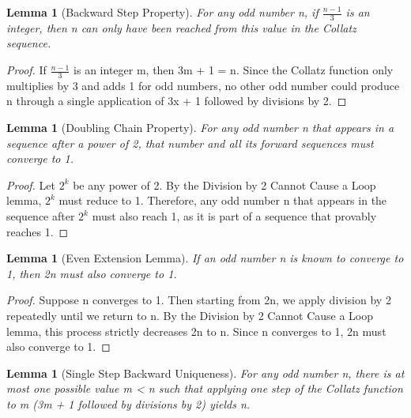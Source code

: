 \documentclass[11pt]{article}
\newtheorem{lemma}[theorem]{Lemma}
\begin{document}
\begin{lemma}[Backward Step Property]
For any odd number n, if \( \frac{n-1}{3} \) is an integer, then n can only have been reached from this value in the Collatz sequence.
\end{lemma}

\begin{proof}
If \( \frac{n-1}{3} \) is an integer m, then 3m + 1 = n. Since the Collatz function only multiplies by 3 and adds 1 for odd numbers, no other odd number could produce n through a single application of 3x + 1 followed by divisions by 2.
\end{proof}

\begin{lemma}[Doubling Chain Property]
For any odd number n that appears in a sequence after a power of 2, that number and all its forward sequences must converge to 1.
\end{lemma}

\begin{proof}
Let \(2^k\) be any power of 2. By the Division by 2 Cannot Cause a Loop lemma, \(2^k\) must reduce to 1. Therefore, any odd number n that appears in the sequence after \(2^k\) must also reach 1, as it is part of a sequence that provably reaches 1.
\end{proof}

\begin{lemma}[Even Extension Lemma]
If an odd number n is known to converge to 1, then 2n must also converge to 1.
\end{lemma}

\begin{proof}
Suppose n converges to 1. Then starting from 2n, we apply division by 2 repeatedly until we return to n.
By the Division by 2 Cannot Cause a Loop lemma, this process strictly decreases 2n to n. 
Since n converges to 1, 2n must also converge to 1.
\end{proof}

\begin{lemma}[Single Step Backward Uniqueness]
For any odd number n, there is at most one possible value m < n such that applying one step of the Collatz function to m (3m + 1 followed by divisions by 2) yields n.
\end{lemma}
\end{document}
